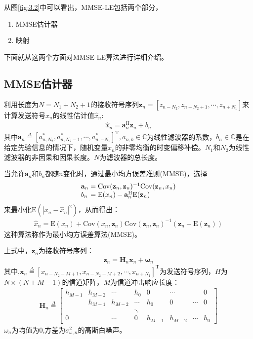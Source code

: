 从图\ref{fig:3.2}中可以看出，MMSE-LE包括两个部分，
\begin{enumerate}
    \item MMSE估计器
    \item 映射
\end{enumerate}
下面就从这两个方面对MMSE-LE算法进行详细介绍。
\subsection{MMSE估计器}
利用长度为$N=N_1+N_2+1$的接收符号序列$\mathbf{z}_n=[z_{n-N_2},z_{n-N_2+1},\cdots,z_{n+N_1}]$来计算发送符号$x_n$的线性估计值$\hat{x}_n$:
\begin{eqnarray}
    \hat{x}_n=\mathbf{a}_n^{\mathrm{H}}\mathbf{z}_n+b_n
    \label{equ:3.1}
\end{eqnarray}
其中$\mathbf{a}_n\overset{\Delta}{=}[a_{n,N_2}^*,a_{n,N_2-1}^*,\cdots,a_{n,-N_1}^*]^{\mathrm{T}},a_{n,k}\in
\mathbb{C}$为线性滤波器的系数，$b_n\in
\mathbb{C}$是在给定先验信息的情况下，随机变量$x_n$的非零均衡的时变偏移补偿。$N_1$和$N_2$为线性滤波器的非因果和因果长度。$N$为滤波器的总长度。

当允许$\mathbf{a}_n$和$b_n$都随$n$变化时，通过最小均方误差准则(MMSE)，选择
\begin{eqnarray}
    \begin{array}{l@{\;=\;}l}
        \mathbf{a}_n&\mathrm{Cov}(\mathbf{z}_n,\mathbf{z}_n)^{-1}\mathrm{Cov}(\mathbf{z}_n,x_n)\\   
        b_n&\mathrm{E}(x_n)-\mathbf{a}_n^{\mathrm{H}}\mathrm{E}(\mathbf{z}_n)
    \end{array}
    \label{equ:3.2}
\end{eqnarray}
来最小化$\mathrm{E}(|x_n-\hat{x}_n|^2)$，从而得出：
\begin{eqnarray}
    \hat{x}_n=\mathrm{E}(x_n)+\mathrm{Cov}(x_n,\mathbf{z}_n)\mathrm{Cov}(\mathbf{z}_n,\mathbf{z}_n)^{-1}(\mathbf{z}_n-\mathrm{E}(\mathbf{z}_n))
    \label{equ:3.3}
\end{eqnarray}
这种算法称作为最小均方误差算法(MMSE)。

上式中，$\mathbf{z}_n$为接收符号序列：
\begin{eqnarray}
    \mathbf{z}_n=\mathbf{H}_n\mathbf{x}_n+\boldsymbol{\omega}_n
    \label{equ:3.4}
\end{eqnarray}
其中,$\mathbf{x}_n\overset{\Delta}{=}[x_{n-N_2-M+1},x_{n-N_2-M+2},\cdots,x_{n+N_1}]^{\mathrm{T}}$为发送符号序列，$H$为$N\times
(N+M-1)$的信道矩阵，$M$为信道冲击响应长度：
\begin{eqnarray}
\mathbf{H}_n\overset{\Delta}{=}\begin{bmatrix}
 h_{M-1}&h_{M-2}  &\cdots  & h_0 & 0 & \cdots &  &0 \\ 
 &h_{M-1}  & h_{M-2} & \cdots & h_0 & 0 & \cdots &0 \\ 
 &  &  &  \ddots&  &  &  & \\ 
 0&  & \cdots & 0 & h_{M-1} &h_{M-2}  &\cdots  & h_0
\end{bmatrix}    
    \label{equ:3.5}
\end{eqnarray}
$\omega_n$为均值为$0$,方差为$\sigma_{\omega,n}^2$的高斯白噪声。


